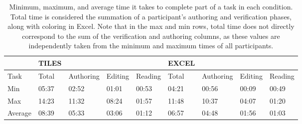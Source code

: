 \begin{table*}[]
 \small

\centering
\begin{tabular}{l|llll|llll}
  		& TILES  	&   		&   		   &   		      & EXCEL  	  &   		  & 				&  			\\
\hline
Task    & Total     & Authoring & Editing	   & Reading   	  & Total     & Authoring & Editing    & Reading 	\\
\hline
Min     & 05:37     & 02:52     & 01:01        & 00:53        & 04:21     & 00:56     & 00:09           & 00:49 	\\
Max     & 14:23     & 11:32     & 08:24        & 01:57        & 11:48     & 10:37     & 04:07           & 01:20 	\\
Average & 08:39     & 05:33     & 03:06        & 01:12        & 06:57     & 04:48     & 01:56           & 01:03 	\\

\end{tabular}
\caption{Minimum, maximum, and average time it takes to complete part of a task in each condition. Total time is considered the summation of a participant's authoring and verification phases, along with coloring in Excel. Note that in the max and min rows, total time does not directly correspond to the sum of the verification and authoring columns, as these values are independently taken from the minimum and maximum times of all participants.}
\label{fig:Times}
\end{table*}